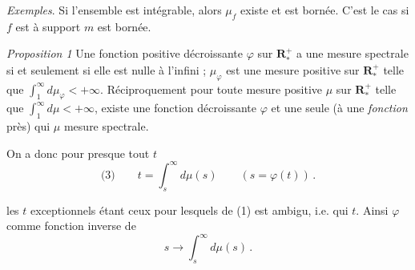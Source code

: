 \documentclass[11pt,a4paper]{article}
\begin{document}
\emph{Exemples}. Si l'ensemble  est intégrable, alors $\mu_f$ existe et est bornée. C'est  le cas si $f$ est à support   $m$ est bornée. \add{\uncertain{Autre exemple} : $f \in C_0(M)$, \uncertain{plus généralement} \ill{} pour tout $\varepsilon$, $|f|^{-1}(]\varepsilon, +\infty[)$ est intégrable.} 

\emph{Proposition 1} Une fonction positive décroissante $\varphi$ sur $\mathbf{R}^{+}_{*}$ a une mesure spectrale si et seulement si elle est nulle à l'infini ; $\mu_\varphi$ est une mesure positive sur $\mathbf{R}^{+}_{*}$ telle que $\int_1^\infty d\mu_\varphi < +\infty$. Réciproquement pour toute mesure positive $\mu$ sur $\mathbf{R}^{+}_{*}$ telle que $\int_1^\infty d\mu < +\infty$, existe une fonction décroissante  $\varphi$  et une seule (à une \emph{fonction} \struck{\ill{}}  près) qui  $\mu$  mesure spectrale.

On a donc pour presque tout $t$
\[
  \text{(3)}\qquad t = \int_s^\infty d\mu(s) \qquad (s = \varphi(t))\,.
\]

les $t$ exceptionnels étant ceux pour lesquels   de (1) est ambigu, i.e. qui \ill{}  \ill{}  $t$. Ainsi $\varphi$   comme fonction inverse de
\[
  s \to \int_s^\infty d\mu(s)\,.
\]

\end{document}
